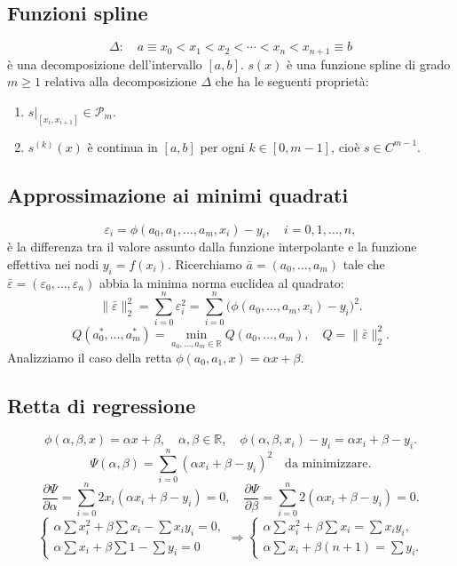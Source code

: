 \documentclass[11pt,a4paper]{article}
\newcommand{\R}{\mathbb R}\newcommand{\F}{\mathbb F}\newcommand{\tr}{\operatorname{tr}}\newcommand{\ar}{\operatorname{arr}}\newcommand{\fl}{\operatorname{fl}}
\newcommand{\pagina}[1]{\clearpage}
\begin{document}
\subsection*{Funzioni spline}
\[\Delta:\quad a\equiv x_0<x_1<x_2<\cdots<x_n<x_{n+1}\equiv b\]
è una decomposizione dell'intervallo $[a,b]$. $s(x)$ è una funzione spline di grado $m\ge1$ relativa alla decomposizione $\Delta$ che ha le seguenti proprietà:
\begin{enumerate}\item $s|_{[x_i,x_{i+1}]}\in\mathcal P_m$.
\item $s^{(k)}(x)$ è continua in $[a,b]$ per ogni $k\in[0,m-1]$, cioè $s\in C^{m-1}$.\end{enumerate}
\subsection*{Approssimazione ai minimi quadrati}
\[\varepsilon_i=\phi(a_0,a_1,\ldots,a_m,x_i)-y_i,\quad i=0,1,\ldots,n,\]
è la differenza tra il valore assunto dalla funzione interpolante e la funzione effettiva nei nodi $y_i=f(x_i)$. Ricerchiamo $\bar a=(a_0,\ldots,a_m)$ tale che $\bar\varepsilon=(\varepsilon_0,\ldots,\varepsilon_n)$ abbia la minima norma euclidea al quadrato:
\[\|\bar\varepsilon\|_2^2=\sum_{i=0}^n\varepsilon_i^2=\sum_{i=0}^n\bigl(\phi(a_0,\ldots,a_m,x_i)-y_i\bigr)^2.\]
\[Q(a_0^*,\ldots,a_m^*)=\min_{a_0,\ldots,a_m\in\R}Q(a_0,\ldots,a_m),\quad Q=\|\bar\varepsilon\|_2^2.\]
Analizziamo il caso della retta $\phi(a_0,a_1,x)=\alpha x+\beta$.
\pagina{35}\subsection*{Retta di regressione}
\[\phi(\alpha,\beta,x)=\alpha x+\beta,\quad\alpha,\beta\in\R,\quad\phi(\alpha,\beta,x_i)-y_i=\alpha x_i+\beta-y_i.\]
\[\Psi(\alpha,\beta)=\sum_{i=0}^n(\alpha x_i+\beta-y_i)^2\quad\text{da minimizzare}.\]
\[\frac{\partial\Psi}{\partial\alpha}=\sum_{i=0}^n2x_i(\alpha x_i+\beta-y_i)=0,\quad\frac{\partial\Psi}{\partial\beta}=\sum_{i=0}^n2(\alpha x_i+\beta-y_i)=0.\]
\[\begin{cases}\alpha\sum x_i^2+\beta\sum x_i-\sum x_iy_i=0,\\\alpha\sum x_i+\beta\sum1-\sum y_i=0\end{cases}\Longrightarrow\begin{cases}\alpha\sum x_i^2+\beta\sum x_i=\sum x_iy_i,\\\alpha\sum x_i+\beta(n+1)=\sum y_i.\end{cases}\]
\end{document}
